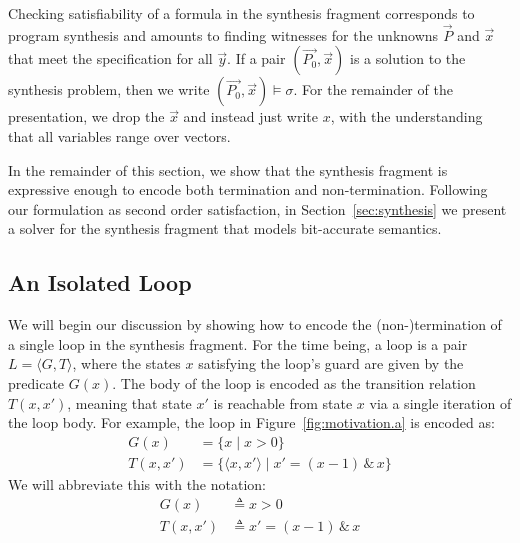 \documentclass[preprint]{sigplanconf}
\theoremstyle{definition}
\begin{document}
Checking satisfiability of a formula in the synthesis fragment corresponds to program synthesis and
amounts to finding witnesses for the unknowns $\vec{P}$ and $\vec{x}$ that meet the specification
for all $\vec{y}$. 
If a pair $(\vec{P_0}, \vec{x})$ is a solution to the synthesis problem, then we write $(\vec{P_0}, \vec{x}) \models \sigma$.
For the remainder of the presentation, we drop the $\vec{x}$ and instead just write $x$, with the understanding
that all variables range over vectors.

In the remainder of this section, we show that the synthesis fragment 
is expressive enough to encode both termination and non-termination. %
Following our formulation as second order satisfaction, %
in Section~\ref{sec:synthesis} we present a solver for the synthesis fragment that models bit-accurate semantics. 


\subsection{An Isolated Loop}

We will begin our discussion by showing how to encode the (non-)termination of a single loop
in the synthesis fragment.  For the time being, a loop is a pair ${L= \langle G,T \rangle}$,
where the states $x$ satisfying the loop's guard are given by the predicate $G(x)$.
The body of the loop is encoded as the transition relation $T(x, x')$, meaning that
state $x'$ is reachable from state $x$ via a single iteration of the loop body.
For example, the loop in Figure~\ref{fig:motivation.a} is encoded as:
\begin{align*}
G(x) & = \{ x \mid x>0 \} \\
T(x,x') &= \{ \langle x, x' \rangle \mid x' = (x - 1) \, \& \, x \}
\end{align*}
We will abbreviate this with the notation:
\begin{align*}
G(x) & \triangleq x > 0 \\
T(x, x') & \triangleq x' = (x - 1) \, \& \, x
\end{align*}
\end{document}
